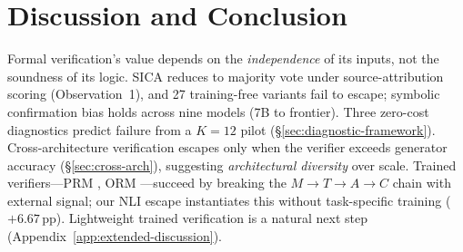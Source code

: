 \section{Discussion and Conclusion}
\label{sec:discussion}
\label{sec:conclusion}
\enlargethispage{3\baselineskip}

Formal verification's value depends on the \emph{independence} of its inputs, not the soundness of its logic. SICA reduces to majority vote under source-attribution scoring (Observation~1), and 27 training-free variants fail to escape; symbolic confirmation bias holds across nine models (7B to frontier). Three zero-cost diagnostics predict failure from a $K{=}12$ pilot (\S\ref{sec:diagnostic-framework}). Cross-architecture verification escapes only when the verifier exceeds generator accuracy (\S\ref{sec:cross-arch}), suggesting \emph{architectural diversity} over scale. Trained verifiers---PRM \citep{lightman2024prm,wang2024mathshepherd}, ORM \citep{cobbe2021gsm8k}---succeed by breaking the $M{\to}T{\to}A{\to}C$ chain with external signal; our NLI escape instantiates this without task-specific training ($+6.67$\,pp). Lightweight trained verification is a natural next step (Appendix~\ref{app:extended-discussion}).
